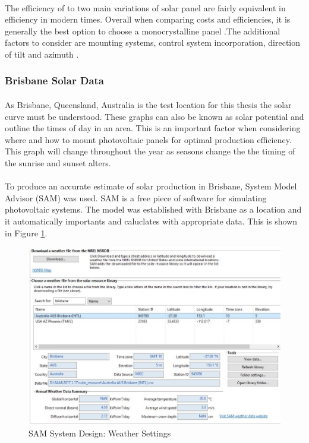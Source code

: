 \paragraph{}
The efficiency of to two main variations of solar panel are fairly equivalent in efficiency in modern times. Overall when comparing costs and efficiencies, it is generally the best option to choose a monocrystalline panel \cite{Haberlin2012}.The additional factors to consider are mounting systems, control system incorporation, direction of tilt and azimuth \cite{Haberlin2012}.  


\subsubsection{Brisbane Solar Data}

\paragraph{}
As Brisbane, Queensland, Australia is the test location for this thesis the solar curve must be understood. These graphs can also be known as solar potential and outline the times of day in an area. This is an important factor when considering where and how to mount photovoltaic panels for optimal production efficiency. This graph will change throughout the year as seasons change the the timing of the sunrise and sunset alters. 

\paragraph{}
To produce an accurate estimate of solar production in Brisbane, System Model Advisor (SAM) was used. SAM is a free piece of software for simulating photovoltaic systems. The model was established with Brisbane as a location and it automatically importants and caluclates with appropriate data. This is shown in Figure \ref{fig:SAM-test1-weather}. 

\begin{figure}[H]
	\hfill\includegraphics[width = 120mm]{images/sam/test1-weather}\hspace*{\fill}
	\caption{SAM System Design: Weather Settings} 
	\label{fig:SAM-test1-weather}
\end{figure}

